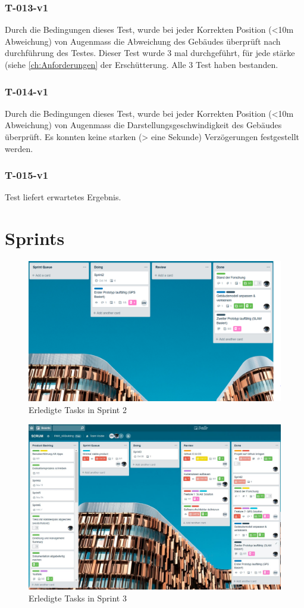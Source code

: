 \documentclass[a4paper]{scrreprt}
\begin{document}
\subsection{T-013-v1}
Durch die Bedingungen dieses Test, wurde bei jeder Korrekten Position (<10m Abweichung) von Augenmass die Abweichung des Gebäudes überprüft nach durchführung des Testes.
Dieser Test wurde 3 mal durchgeführt, für jede stärke (siehe \ref{ch:Anforderungen} der Erschütterung.
Alle 3 Test haben bestanden.
\subsection{T-014-v1}
Durch die Bedingungen dieses Test, wurde bei jeder Korrekten Position (<10m Abweichung) von Augenmass die Darstellungsgeschwindigkeit des Gebäudes überprüft. Es konnten keine starken (> eine Sekunde) Verzögerungen festgestellt werden.
\subsection{T-015-v1}
Test liefert erwartetes Ergebnis.
\chapter{Sprints}

\begin{figure}[h!]
	\includegraphics[keepaspectratio,width=\textwidth]{SprintReview_2}
	\caption{Erledigte Tasks in Sprint 2}
\end{figure}

\begin{figure}[h!]
	\includegraphics[keepaspectratio,width=\textwidth]{SprintReview_3}
	\caption{Erledigte Tasks in Sprint 3}
\end{figure}
\end{document}

